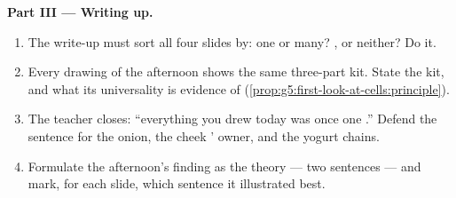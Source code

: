\begin{problem}
\medskip\noindent\textbf{Part III --- Writing up.}
\begin{enumerate}[resume]
  \item The write-up must sort all four slides by: one
         or many? ,  or neither? Do it.
  \item Every drawing of the afternoon shows the same
        three-part kit. State the kit, and what its
        universality is evidence of
        (\cref{prop:g5:first-look-at-cells:principle}).
  \item The teacher closes: ``everything you drew today
        was once one .'' Defend the sentence for the
        onion, the cheek ' owner, and the yogurt
        chains.
  \item Formulate the afternoon's finding as the 
        theory --- two sentences --- and mark, for each
        slide, which sentence it illustrated best.
\end{enumerate}
\end{problem}
